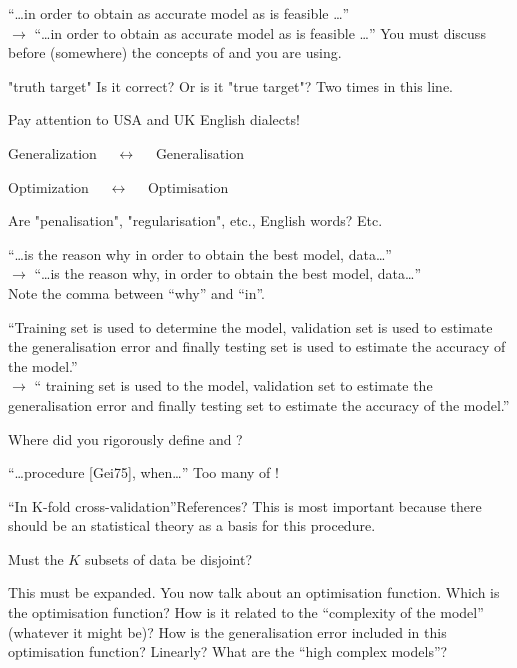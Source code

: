 \begin{description}[style=unboxed,leftmargin=0cm,itemsep=3ex]
``\dots in order to obtain as accurate model as is feasible \dots''\\
$\rightarrow$
``\dots in order to obtain as  accurate model as is feasible \dots''
You must discuss before (somewhere) the concepts of  and
 you are using.

"truth target" Is it correct? Or is it "true target"?
Two times in this line.

Pay attention to USA and UK English dialects!

Generalization $\quad\longleftrightarrow\quad$ Generalisation

Optimization  $\quad\longleftrightarrow\quad$ Optimisation

Are "penalisation", "regularisation", etc., English words? Etc.

``\dots is the reason why in order to obtain the best model, data\dots'' \\
$\rightarrow$
``\dots is the reason why, in order to obtain the best model, data\dots'' \\
Note the comma between ``why'' and ``in''.

``Training set is used to determine the model, validation set is used 
to estimate the generalisation error and finally testing set is used
to estimate the accuracy of the model.'' \\
$\rightarrow$
`` training set is used to  the model, 
 validation set to estimate the generalisation error and finally
 testing set to estimate the accuracy of the model.'' \\

Where did you rigorously define  and
?

``\dots procedure [Gei75],  when\dots''
Too many  of !

``In K-fold cross-validation''\quad References? This is most important
because there should be an statistical theory as a basis for this
procedure.

Must the $K$ subsets of data be disjoint?

This must be expanded.
You now talk about an optimisation function.
Which is the optimisation function?
How is it related to the ``complexity of the model'' (whatever it might be)?
How is the generalisation error included in this optimisation function?
Linearly?
What are the ``high complex models''?


\end{description}
